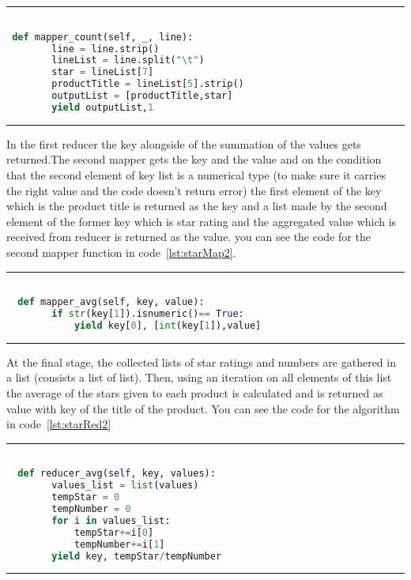 \rule{200 pt}{0.5 pt} 

\renewcommand{\lstlistingname}{Code}
\lstset{style=mystyle}
\begin{lstlisting}[language=Python, caption={The average starts given to each product by the reviewers, first mapper function}, label={lst:starMap1}, mathescape = true, breaklines=true]

 def mapper_count(self, _, line):
        line = line.strip() 
        lineList = line.split("\t")
        star = lineList[7]
        productTitle = lineList[5].strip()
        outputList = [productTitle,star]
        yield outputList,1

\end{lstlisting}

\rule{200 pt}{0.5 pt}


In the first reducer the key alongside of the summation of the values gets returned.The second mapper gets the key and the value and on the condition that the second element of key list is a numerical type (to make sure it carries the right value and the code doesn't return error) the first element of the key which is the product title is returned as the key and a list made by the second element of the former key which is star rating and the aggregated value which is received from reducer is returned as the value. you can see the code for the second mapper function in code~\ref{lst:starMap2}.


\rule{200 pt}{0.5 pt} 

\renewcommand{\lstlistingname}{Code}
\lstset{style=mystyle}
\begin{lstlisting}[language=Python, caption={The average starts given to each product by the reviewers, second mapper}, label={lst:starMap2}, mathescape = true, breaklines=true]

  def mapper_avg(self, key, value):
        if str(key[1]).isnumeric()== True:
            yield key[0], [int(key[1]),value]

\end{lstlisting}

\rule{200 pt}{0.5 pt}


At the final stage, the collected lists of star ratings and numbers are gathered in a list (consists a list of list). Then, using an iteration on all elements of this list the average of the stars given to each product is calculated and is returned as value with key of the title of the product. You can see the code for the algorithm in code~\ref{lst:starRed2}

\rule{200 pt}{0.5 pt} 

\renewcommand{\lstlistingname}{Code}
\lstset{style=mystyle}
\begin{lstlisting}[language=Python, caption={The average starts given to each product by the reviewers, second reducer}, label={lst:starRed2}, mathescape = true, breaklines=true]

  def reducer_avg(self, key, values):
        values_list = list(values)
        tempStar = 0
        tempNumber = 0
        for i in values_list:
            tempStar+=i[0]
            tempNumber+=i[1]
        yield key, tempStar/tempNumber

\end{lstlisting}

\rule{200 pt}{0.5 pt}

